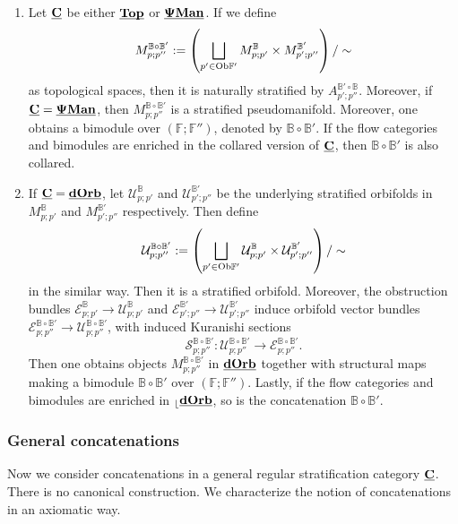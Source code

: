 \documentclass[reqno, 10pt]{amsart}
\numberwithin{equation}{section}
\numberwithin{equation}{section}
\theoremstyle{definition}
\theoremstyle{remark}
\newcommand{\beqn}{\begin{equation*}}
\newcommand{\eeqn}{\end{equation*}}
\newcommand{\mb}{\mathbb}
\newcommand{\mc}{\mathcal}
\renewcommand{\outer}{{}_{\lfloor}}
\newcommand{\pman}{\uds{{\bf \Psi}{\bf Man}}}
\newcommand{\uds}[1]{\underline{\smash{#1}}}
\begin{document}
\begin{enumerate}

\item Let $\uds{\bf C}$ be either $\uds{\bf Top}$ or $\pman$. If we define 
\beqn
M_{p; p''}^{{\mb B} \circ {\mb B}'}:= \left( \bigsqcup_{p' \in {\rm Ob}{\mb F}'} M_{p; p'}^{{\mb B}} \times M_{p'; p''}^{{\mb B}'} \right)/ \sim
\eeqn
as topological spaces, then it is naturally stratified by $A_{p'; p''}^{{\mb B}'\circ {\mb B}}$. Moreover, if $\uds{\bf C} = \pman$, then $M_{p; p''}^{{\mb B}\circ {\mb B}'}$ is a stratified pseudomanifold. Moreover, one obtains a bimodule over $({\mb F}; {\mb F}'')$, denoted by ${\mb B} \circ {\mb B}'$. If the flow categories and bimodules are enriched in the collared version of $\uds{\bf C}$, then ${\mb B} \circ {\mb B}'$ is also collared.

\item If $\uds{\bf C} = \uds{\bf dOrb}$, let ${\mc U}_{p; p'}^{\mb B}$ and ${\mc U}_{p'; p''}^{{\mb B}'}$ be the underlying stratified orbifolds in $M_{p;p'}^{{\mb B}}$ and $M_{p'; p''}^{{\mb B}'}$ respectively. Then define
\beqn
{\mc U}_{p; p''}^{{\mb B}\circ {\mb B}'}:= \left( \bigsqcup_{p' \in {\rm Ob}{\mb F}'} {\mc U}_{p; p'}^{{\mb B}} \times {\mc U}_{p'; p''}^{{\mb B}'} \right) / \sim
\eeqn
in the similar way. Then it is a stratified orbifold. Moreover, the obstruction bundles ${\mc E}_{p;p'}^{\mb B} \to {\mc U}_{p;p'}^{\mb B}$ and ${\mc E}_{p'; p''}^{{\mb B}'} \to {\mc U}_{p'; p''}^{{\mb B}'}$ induce orbifold vector bundles ${\mc E}_{p; p''}^{{\mb B} \circ {\mb B}'} \to {\mc U}_{p; p''}^{{\mb B} \circ {\mb B}'}$, with induced Kuranishi sections 
\beqn
{\mc S}_{p;p''}^{{\mb B} \circ {\mb B}'}: {\mc U}_{p; p''}^{{\mb B} \circ {\mb B}'} \to {\mc E}_{p; p''}^{{\mb B}\circ {\mb B}'}.
\eeqn
Then one obtains objects $M_{p; p''}^{{\mb B}\circ {\mb B}'}$ in $\uds{\bf dOrb}$ together with structural maps making a bimodule ${\mb B}\circ {\mb B}'$ over $({\mb F}; {\mb F}'')$. Lastly, if the flow categories and bimodules are enriched in $\outer \uds{\bf dOrb}$, so is the concatenation ${\mb B} \circ {\mb B}'$.
\end{enumerate}



\subsubsection{General concatenations}

Now we consider concatenations in a general regular stratification category $\uds{\bf C}$. There is no canonical construction. We characterize the notion of concatenations in an axiomatic way. 
\end{document}
